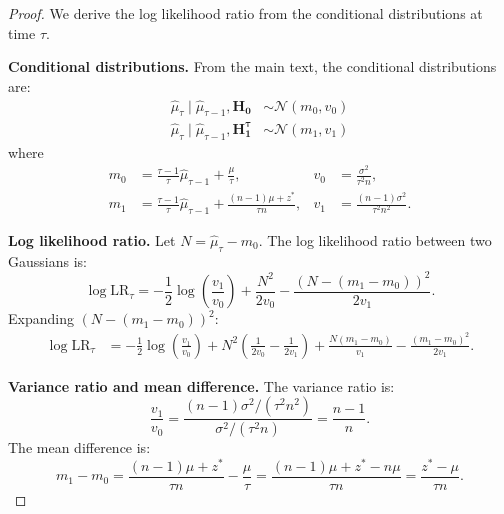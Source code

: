 \documentclass{article}
\theoremstyle{plain}
\theoremstyle{definition}
\theoremstyle{remark}
\newcommand{\cN}{\ensuremath{\mathcal{N}}}
\begin{document}
\begin{proof}
    We derive the log likelihood ratio from the conditional distributions at time $\tau$.

    \textbf{Conditional distributions.}
    From the main text, the conditional distributions are:
    \begin{align*}
        \hat{\mu}_\tau \mid \hat{\mu}_{\tau-1}, \mathbf{H_0}      & \sim \cN\left(m_0, v_0\right) \\
        \hat{\mu}_\tau \mid \hat{\mu}_{\tau-1}, \mathbf{H_1^\tau} & \sim \cN\left(m_1, v_1\right)
    \end{align*}
    where
    \begin{align*}
        m_0 & = \frac{\tau-1}{\tau} \hat{\mu}_{\tau-1} + \frac{\mu}{\tau},              & v_0 & = \frac{\sigma^2}{\tau^2 n},        \\
        m_1 & = \frac{\tau-1}{\tau} \hat{\mu}_{\tau-1} + \frac{(n-1)\mu + z^*}{\tau n}, & v_1 & = \frac{(n-1)\sigma^2}{\tau^2 n^2}.
    \end{align*}

    \textbf{Log likelihood ratio.}
    Let $N = \hat{\mu}_\tau - m_0$. The log likelihood ratio between two Gaussians is:
    \begin{equation*}
        \log \mathrm{LR}_\tau = -\frac{1}{2}\log\left(\frac{v_1}{v_0}\right) + \frac{N^2}{2v_0} - \frac{(N - (m_1-m_0))^2}{2v_1}.
    \end{equation*}
    Expanding $(N - (m_1-m_0))^2$:
    \begin{align*}
        \log \mathrm{LR}_\tau & = -\frac{1}{2}\log\left(\frac{v_1}{v_0}\right) + N^2\left(\frac{1}{2v_0} - \frac{1}{2v_1}\right) + \frac{N(m_1-m_0)}{v_1} - \frac{(m_1-m_0)^2}{2v_1}.
    \end{align*}

    \textbf{Variance ratio and mean difference.}
    The variance ratio is:
    \begin{equation*}
        \frac{v_1}{v_0} = \frac{(n-1)\sigma^2 / (\tau^2 n^2)}{\sigma^2 / (\tau^2 n)} = \frac{n-1}{n}.
    \end{equation*}
    The mean difference is:
    \begin{equation*}
        m_1 - m_0 = \frac{(n-1)\mu + z^*}{\tau n} - \frac{\mu}{\tau} = \frac{(n-1)\mu + z^* - n\mu}{\tau n} = \frac{z^* - \mu}{\tau n}.
    \end{equation*}


\end{proof}
\end{document}
